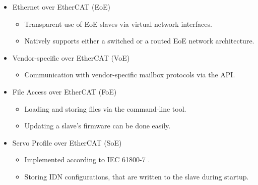 \documentclass[a4paper,12pt,BCOR=6mm,bibtotoc,idxtotoc]{scrbook}
\begin{document}
\begin{itemize}
\begin{itemize}
  \item SDO upload, download and information service.

  \item Slave configuration via SDOs.

  \item SDO access from userspace and from the application.

  \end{itemize}

\item Ethernet over EtherCAT (EoE)

  \begin{itemize}

  \item Transparent use of EoE slaves via virtual network interfaces.

  \item Natively supports either a switched or a routed EoE network
  architecture.

  \end{itemize}

\item Vendor-specific over EtherCAT (VoE)

  \begin{itemize}

  \item Communication with vendor-specific mailbox protocols via the API.

  \end{itemize}

\item File Access over EtherCAT (FoE)

  \begin{itemize}

  \item Loading and storing files via the command-line tool.

  \item Updating a slave's firmware can be done easily.

  \end{itemize}

\item Servo Profile over EtherCAT (SoE)

  \begin{itemize}

  \item Implemented according to IEC 61800-7 \cite{soespec}.

  \item Storing IDN configurations, that are written to the slave during
  startup.


\end{itemize}
\end{itemize}
\end{document}
